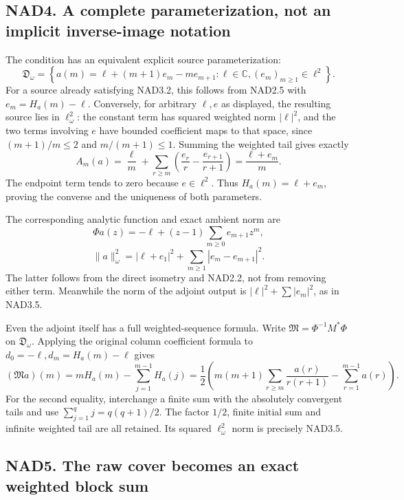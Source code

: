 \subsection{NAD4. A complete parameterization, not an implicit
inverse-image
notation}\label{nad4.-a-complete-parameterization-not-an-implicit-inverse-image-notation}

The condition has an equivalent explicit source parameterization: \[
 \boxed{\mathfrak D_\omega=
 \left\{a(m)=\ell+(m+1)e_m-me_{m+1}:\ell\in\mathbb C,
                   (e_m)_{m\ge1}\in\ell^2\right\}.}
 \tag{NAD4.1}
\] For a source already satisfying NAD3.2, this follows from NAD2.5 with
\(e_m=H_a(m)-\ell\). Conversely, for arbitrary \(\ell,e\) as displayed,
the resulting source lies in \(\ell^2_\omega\): the constant term has
squared weighted norm \(|\ell|^2\), and the two terms involving \(e\)
have bounded coefficient maps to that space, since \((m+1)/m\le2\) and
\(m/(m+1)\le1\). Summing the weighted tail gives exactly \[
 A_m(a)=\frac\ell m+
 \sum_{r\ge m}\left(\frac{e_r}r-\frac{e_{r+1}}{r+1}\right)
 =\frac{\ell+e_m}{m}.
\] The endpoint term tends to zero because \(e\in\ell^2\). Thus
\(H_a(m)=\ell+e_m\), proving the converse and the uniqueness of both
parameters.

The corresponding analytic function and exact ambient norm are \[
 \Phi a(z)=-\ell+(z-1)\sum_{m\ge0}e_{m+1}z^m,
\] \[
 \boxed{\|a\|_\omega^2=|\ell+e_1|^2+
               \sum_{m\ge1}|e_m-e_{m+1}|^2.}
 \tag{NAD4.2}
\] The latter follows from the direct isometry and NAD2.2, not from
removing either term. Meanwhile the norm of the adjoint output is
\(|\ell|^2+\sum|e_m|^2\), as in NAD3.5.

Even the adjoint itself has a full weighted-sequence formula. Write
\(\mathfrak M=\Phi^{-1}M^*\Phi\) on \(\mathfrak D_\omega\). Applying the
original column coefficient formula to \(d_0=-\ell,d_m=H_a(m)-\ell\)
gives \[
 (\mathfrak M a)(m)=mH_a(m)-\sum_{j=1}^{m-1}H_a(j)
 =\boxed{\frac12\left(m(m+1)\sum_{r\ge m}\frac{a(r)}{r(r+1)}
                     -\sum_{r=1}^{m-1}a(r)\right).}
 \tag{NAD4.3}
\] For the second equality, interchange a finite sum with the absolutely
convergent tails and use \(\sum_{j=1}^{q}j=q(q+1)/2\). The factor
\(1/2\), finite initial sum and infinite weighted tail are all retained.
Its squared \(\ell^2_\omega\) norm is precisely NAD3.5.

\subsection{NAD5. The raw cover becomes an exact weighted block
sum}\label{nad5.-the-raw-cover-becomes-an-exact-weighted-block-sum}

